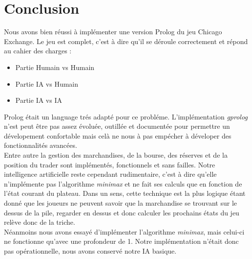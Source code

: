\documentclass[11pt,a4paper,twoside,french,svgnames]{report}
\begin{document}
\chapter{Conclusion}
Nous avons bien réussi à implémenter une version Prolog du jeu Chicago Exchange. Le jeu est complet, c'est à dire qu'il se déroule correctement et répond au cahier des charges :
\begin{itemize}
   \item Partie Humain vs Humain
   \item Partie IA vs Humain
   \item Partie IA vs IA
\end{itemize}
Prolog était un language trés adapté pour ce probléme. L'implémentation \textit{gprolog} n'est peut être pas assez évoluée, outillée et documentée pour permettre un dévelopement confortable mais celà ne nous à pas empécher à déveloper des fonctionnalités avancées.\\
Entre autre la gestion des marchandises, de la bourse, des réserves et de la position du trader sont implémentés, fonctionnels et sans failles. Notre intelligence artificielle reste cependant rudimentaire, c'est à dire qu'elle n'implémente pas l'algorithme \textit{minimax} et ne fait ses calculs que en fonction de l'état courant du plateau. Dans un sens, cette technique est la plus logique étant donné que les joueurs ne peuvent savoir que la marchandise se trouvant sur le dessus de la pile, regarder en dessus et donc calculer les prochains états du jeu relève donc de la triche.\\
Néanmoins nous avons essayé d'implémenter l'algorithme \textit{minimax}, mais celui-ci ne fonctionne qu'avec une profondeur de 1. Notre implémentation n'était donc pas opérationnelle, nous avons conservé notre IA basique.
\end{document}
